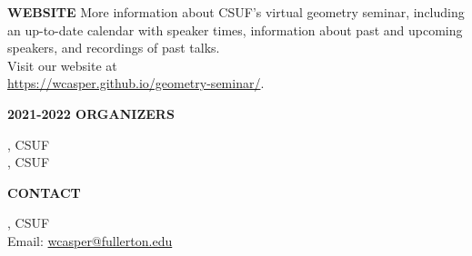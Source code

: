 \documentclass[a4paper]{article}
\begin{document}
\begin{minipage}{0.95\textwidth}
\begin{minipage}[b]{0.47\textwidth}
\medskip

\large{\color{csecondary}\textbf{WEBSITE}}
More information about CSUF's virtual geometry seminar, including an up-to-date calendar with speaker times, information about past and upcoming speakers, and recordings of past talks.\\
Visit our website at\\ \href{https://wcasper.github.io/geometry-seminar/}{https://wcasper.github.io/geometry-seminar/}.

\medskip
\textbf{\color{csecondary}\large 2021-2022 ORGANIZERS}\par
{}, CSUF\\
, CSUF

\medskip

\textbf{\color{csecondary}\large CONTACT }\par

, CSUF\\
Email: \href{mailto:wcasper@fullerton.edu}{wcasper@fullerton.edu}

\rule{0pt}{78pt}
\end{minipage}
\vspace*{-70pt}

\end{minipage}
\end{document}
